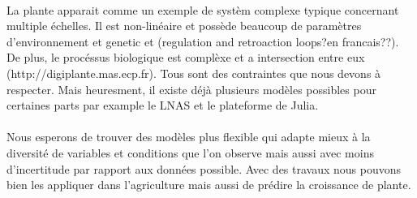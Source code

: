 \paragraph{} 
La plante apparait comme un exemple de syst\`em complexe typique concernant multiple \'echelles. Il est non-lin\'eaire et poss\`ede beaucoup de param\`etres d'environnement et genetic et (regulation and retroaction loops?en francais??). De plus,  le proc\'essus biologique est compl\`exe et a intersection entre eux (http://digiplante.mas.ecp.fr). Tous sont des contraintes que nous devons \`a respecter. Mais heuresment, il existe d\'ej\`a plusieurs mod\`eles possibles pour certaines parts par example le LNAS et le plateforme de Julia.
\paragraph{}
Nous esperons de trouver des mod\`eles plus flexible qui adapte mieux \`a la diversit\'e de variables et conditions que l'on observe mais aussi avec moins d'incertitude par rapport aux donn\'ees possible. Avec des travaux nous pouvons bien les appliquer dans l'agriculture mais aussi de pr\'edire la croissance de plante.